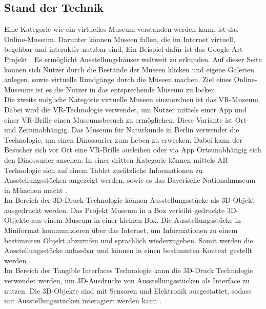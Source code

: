 \documentclass[runningheads,a4paper]{llncs}
\begin{document}
\subsection{Stand der Technik} \label{standtechnik}

Eine Kategorie wie ein virtuelles Museum verstanden werden kann, ist das Online-Museum. Darunter können Museen fallen, die im Internet virtuell, begehbar und interaktiv nutzbar sind. Ein Beispiel dafür ist das Google Art Projekt \cite{GoogleCultureInstitut.2011}. Es ermöglicht Ausstellungshäuser weltweit zu erkunden. Auf dieser Seite können sich Nutzer durch die Bestände der Museen klicken und eigene Galerien anlegen, sowie virtuelle Rundgänge durch die Museen machen. Ziel eines Online-Museums ist es die Nutzer in das entsprechende Museum zu locken.\\ 

Die zweite mögliche Kategorie virtuelle Museen einzuordnen ist das VR-Museum. Dabei wird die VR-Technologie verwendet, um Nutzer mittels einer App und einer VR-Brille einen Museumsbesuch zu ermöglichen. Diese Variante ist Ort- und Zeitunabhängig. Das Museum für Naturkunde in Berlin verwendet die Technologie, um einen Dinosaurier zum Leben zu erwecken. Dabei kann der Besucher sich vor Ort eine VR-Brille ausleihen oder via App Ortsunabhängig sich den Dinosaurier ansehen. In einer dritten Kategorie können mittels AR-Technologie sich auf einem Tablet zusätzliche Informationen zu Ausstellungsstücken angezeigt werden, sowie es das Bayerische Nationalmuseum in München macht \cite{GoetheInstitute.V..2017}.\\

Im Bereich der 3D-Druck Technologie können Ausstellungsstücke als 3D-Objekt ausgedruckt werden. Das Projekt Museum in a Box verleiht gedruckte 3D-Objekte aus einem Museum in einer kleinen Box. Die Ausstellungsstücke in Miniformat kommunizieren über das Internet, um Informationen zu einem bestimmten Objekt abzurufen und sprachlich wiederzugeben. Somit werden die Ausstellungsstücke anfassbar und können in einen bestimmten Kontext gestellt werden \cite{GeorgeOates.2015}.\\

Im Bereich der Tangible Interfaces Technologie kann die 3D-Druck Technologie verwendet werden, um 3D-Ausdrucke von Ausstellungsstücken als Interface zu nutzen. Die 3D-Objekte sind mit Sensoren und Elektronik ausgestattet, sodass mit Ausstellungsstücken interagiert werden kann \cite{Capurro.2015}.\\ 
\end{document}
